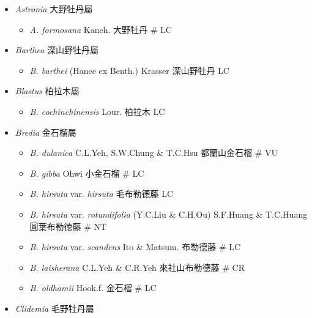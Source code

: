 
  \begin{itemize}
 \item[] \textit{Astronia} 大野牡丹屬
                                
  \begin{itemize}
        \item[] \textit{A. formosana} Kaneh.  大野牡丹  \# LC
  \end{itemize}
 \item[] \textit{Barthea} 深山野牡丹屬
                                
  \begin{itemize}
        \item[] \textit{B. barthei} (Hance ex Benth.) Krasser  深山野牡丹   LC
  \end{itemize}
 \item[] \textit{Blastus} 柏拉木屬
                                
  \begin{itemize}
        \item[] \textit{B. cochinchinensis} Lour.  柏拉木   LC
  \end{itemize}
 \item[] \textit{Bredia} 金石榴屬
                                
  \begin{itemize}
        \item[] \textit{B. dulanica} C.L.Yeh, S.W.Chung \& T.C.Hsu  都蘭山金石榴  \# VU
        \item[] \textit{B. gibba} Ohwi  小金石榴  \# LC
        \item[] \textit{B. hirsuta} var. \textit{hirsuta}   毛布勒德藤   LC
        \item[] \textit{B. hirsuta} var. \textit{rotundifolia} (Y.C.Liu \& C.H.Ou) S.F.Huang \& T.C.Huang  圓葉布勒徳藤  \# NT
        \item[] \textit{B. hirsuta} var. \textit{scandens} Ito \& Matsum.  布勒德藤  \# LC
        \item[] \textit{B. laisherana} C.L.Yeh \& C.R.Yeh  來社山布勒德藤  \# CR
        \item[] \textit{B. oldhamii} Hook.f.  金石榴  \# LC
  \end{itemize}
 \item[] \textit{Clidemia} 毛野牡丹屬
                                

\end{itemize}
